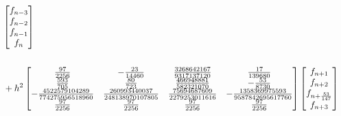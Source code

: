 \documentclass[12pt]{report}
\begin{document}
\begin{align}
\begin{split}
\begin{bmatrix}
f_{n-3}\\ f_{n-2} \\ f_{n-1} \\ f_{n}
\end{bmatrix} \\\\
&\hspace{-12mm}
+h^{2}\begin{bmatrix}
\frac{97}{2256} & -\frac{23}{14460} & \frac{3268642167}{9317137120} & \frac{17}{139680}\\
\frac{593}{705} & \frac{80}{723} & \frac{466948881}{582321070} & -\frac{53}{8730}\\
-\frac{4522579104289}{774275956518960} & \frac{260993440037}{248138970107805} & \frac{75694687609}{2279253011616} & -\frac{1358369975593}{9587842695617760}\\
\frac{97}{2256} & \frac{97}{2256} & \frac{97}{2256} & \frac{97}{2256}
\end{bmatrix}\begin{bmatrix}
f_{n+1}\\ f_{n+2} \\ f_{n+\frac{53}{147}} \\ f_{n+3}
\end{bmatrix}
\end{split}
\end{align}
\end{document}
